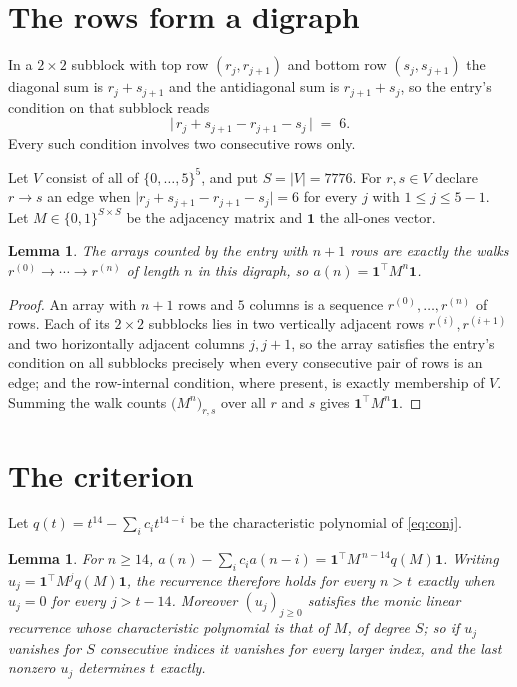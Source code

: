 \documentclass[11pt,a4paper]{article}
\theoremstyle{plain}
\newtheorem{lemma}[theorem]{Lemma}
\theoremstyle{definition}
\begin{document}
\section{The rows form a digraph}

In a $2\times2$ subblock with top row $(r_j,r_{j+1})$ and bottom row $(s_j,s_{j+1})$ the
diagonal sum is $r_j+s_{j+1}$ and the antidiagonal sum is $r_{j+1}+s_j$, so the entry's
condition on that subblock reads
\[
\bigl|\,r_j+s_{j+1}-r_{j+1}-s_j\,\bigr|\;=\;6.
\]
Every such condition involves two consecutive rows only.

Let $V$ consist of all of $\{0,\dots,5\}^{5}$, and put $S=|V|=7776$. For $r,s\in V$ declare $r\to s$ an edge
when $\bigl|r_j+s_{j+1}-r_{j+1}-s_j\bigr|=6$ for every $j$ with
$1\le j\le5-1$. Let $M\in\{0,1\}^{S\times S}$ be the adjacency matrix and $\mathbf{1}$
the all-ones vector.

\begin{lemma}\label{lem:walk}
The arrays counted by the entry with $n+1$ rows are exactly the walks
$r^{(0)}\to\cdots\to r^{(n)}$ of length $n$ in this digraph, so
$a(n)=\mathbf{1}^{\!\top}M^{n}\mathbf{1}$.
\end{lemma}

\begin{proof}
An array with $n+1$ rows and $5$ columns is a sequence $r^{(0)},\dots,r^{(n)}$ of
rows. Each of its $2\times2$ subblocks lies in two vertically adjacent rows
$r^{(i)},r^{(i+1)}$ and two horizontally adjacent columns $j,j+1$, so the array satisfies
the entry's condition on all subblocks precisely when every consecutive pair of rows is an
edge; and the row-internal condition, where present, is exactly membership of $V$. Summing
the walk counts $\bigl(M^{n}\bigr)_{r,s}$ over all $r$ and $s$ gives
$\mathbf{1}^{\!\top}M^{n}\mathbf{1}$.
\end{proof}

\section{The criterion}

Let $q(t)=t^{14}-\sum_i c_i t^{14-i}$ be the characteristic polynomial of
\eqref{eq:conj}.

\begin{lemma}\label{lem:crit}
For $n\ge14$,
$a(n)-\sum_i c_i a(n-i)=\mathbf{1}^{\!\top}M^{\,n-14}q(M)\mathbf{1}$. Writing
$u_j=\mathbf{1}^{\!\top}M^{j}q(M)\mathbf{1}$, the recurrence therefore holds for every
$n>t$ exactly when $u_j=0$ for every $j>t-14$. Moreover $(u_j)_{j\ge0}$ satisfies the
monic linear recurrence whose characteristic polynomial is that of $M$, of degree $S$; so
if $u_j$ vanishes for $S$ consecutive indices it vanishes for every larger index, and the
last nonzero $u_j$ determines $t$ exactly.
\end{lemma}
\end{document}
